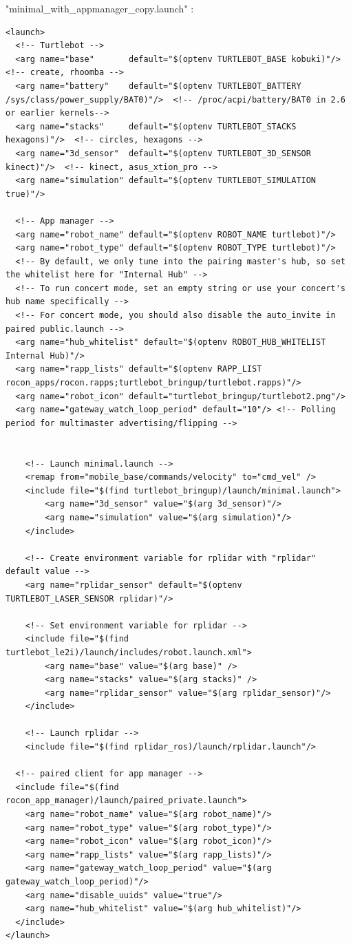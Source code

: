 \documentclass[10pt,a4paper]{article}
\begin{document}
"minimal\_with\_appmanager\_copy.launch" : 
\begin{lstlisting}[frame=single]
<launch>
  <!-- Turtlebot -->
  <arg name="base"       default="$(optenv TURTLEBOT_BASE kobuki)"/>  <!-- create, rhoomba -->
  <arg name="battery"    default="$(optenv TURTLEBOT_BATTERY /sys/class/power_supply/BAT0)"/>  <!-- /proc/acpi/battery/BAT0 in 2.6 or earlier kernels-->
  <arg name="stacks"     default="$(optenv TURTLEBOT_STACKS hexagons)"/>  <!-- circles, hexagons -->
  <arg name="3d_sensor"  default="$(optenv TURTLEBOT_3D_SENSOR kinect)"/>  <!-- kinect, asus_xtion_pro -->
  <arg name="simulation" default="$(optenv TURTLEBOT_SIMULATION true)"/>

  <!-- App manager -->
  <arg name="robot_name" default="$(optenv ROBOT_NAME turtlebot)"/>
  <arg name="robot_type" default="$(optenv ROBOT_TYPE turtlebot)"/>
  <!-- By default, we only tune into the pairing master's hub, so set the whitelist here for "Internal Hub" -->
  <!-- To run concert mode, set an empty string or use your concert's hub name specifically -->
  <!-- For concert mode, you should also disable the auto_invite in paired public.launch -->
  <arg name="hub_whitelist" default="$(optenv ROBOT_HUB_WHITELIST Internal Hub)"/>
  <arg name="rapp_lists" default="$(optenv RAPP_LIST rocon_apps/rocon.rapps;turtlebot_bringup/turtlebot.rapps)"/>
  <arg name="robot_icon" default="turtlebot_bringup/turtlebot2.png"/>
  <arg name="gateway_watch_loop_period" default="10"/> <!-- Polling period for multimaster advertising/flipping -->


	<!-- Launch minimal.launch -->
	<remap from="mobile_base/commands/velocity" to="cmd_vel" />	
	<include file="$(find turtlebot_bringup)/launch/minimal.launch">
		<arg name="3d_sensor" value="$(arg 3d_sensor)"/>
		<arg name="simulation" value="$(arg simulation)"/>
	</include>
	
	<!-- Create environment variable for rplidar with "rplidar" default value -->
	<arg name="rplidar_sensor" default="$(optenv TURTLEBOT_LASER_SENSOR rplidar)"/>
	
	<!-- Set environment variable for rplidar -->
	<include file="$(find turtlebot_le2i)/launch/includes/robot.launch.xml">
		<arg name="base" value="$(arg base)" />
		<arg name="stacks" value="$(arg stacks)" />
		<arg name="rplidar_sensor" value="$(arg rplidar_sensor)"/>
	</include>
	
	<!-- Launch rplidar -->
	<include file="$(find rplidar_ros)/launch/rplidar.launch"/>

  <!-- paired client for app manager -->
  <include file="$(find rocon_app_manager)/launch/paired_private.launch">
    <arg name="robot_name" value="$(arg robot_name)"/>
    <arg name="robot_type" value="$(arg robot_type)"/>
    <arg name="robot_icon" value="$(arg robot_icon)"/>
    <arg name="rapp_lists" value="$(arg rapp_lists)"/>
    <arg name="gateway_watch_loop_period" value="$(arg gateway_watch_loop_period)"/>
    <arg name="disable_uuids" value="true"/>
    <arg name="hub_whitelist" value="$(arg hub_whitelist)"/>
  </include>
</launch>
\end{lstlisting}
\newpage
\end{document}
